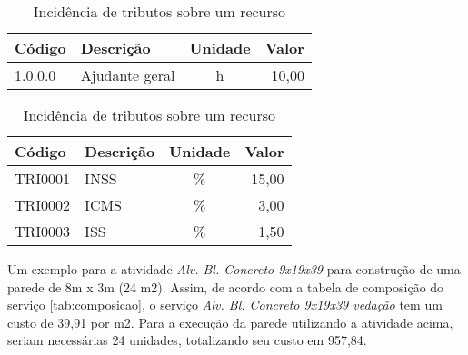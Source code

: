 \begin{table}[h]
	\centering
	\begin{tabular}{|l|l|c|r|}
	\hline
	Código&			Descrição&						Unidade&		Valor 	\\ \hline
	1.0.0.0&		Ajudante geral&					h&				10,00	\\ \hline
	\end{tabular}
	\begin{tabular}{|l|l|c|r|}
	\hline
	Código&			Descrição&						Unidade&		Valor 	\\ \hline
	TRI0001&		INSS&							\%&				15,00	\\ \hline
	TRI0002&		ICMS&							\%&				3,00	\\ \hline
	TRI0003&		ISS&							\%&				1,50	\\ \hline
	\end{tabular}
	\caption{Incidência de tributos sobre um recurso}
	\label{tab:insumos_exemplo1}
\end{table}

Um exemplo para a atividade \emph{Alv. Bl. Concreto 9x19x39} para construção de uma parede de 8m x 3m (24 m2). Assim, de acordo com a tabela de composição do serviço \ref{tab:composicao}, o serviço \emph{Alv. Bl. Concreto 9x19x39 vedação} tem um custo de 39,91 por m2. Para a execução da parede utilizando a atividade acima, seriam necessárias 24 unidades, totalizando seu custo em 957,84.
